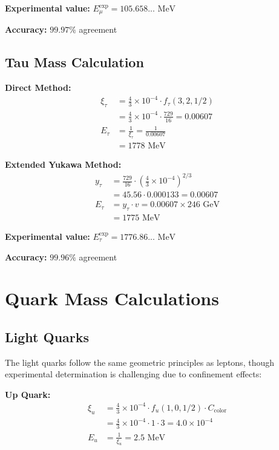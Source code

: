 \documentclass[12pt,a4paper]{article}
\begin{document}
	\textbf{Experimental value:} $E_\mu^{\text{exp}} = 105.658... \text{ MeV}$
	
	\textbf{Accuracy:} $99.97\%$ agreement
	
	\subsection{Tau Mass Calculation}
	\label{subsec:tau_calculation}
	
	\textbf{Direct Method:}
	\begin{align}
		\xi_\tau &= \frac{4}{3} \times 10^{-4} \cdot f_\tau(3,2,1/2) \\
		&= \frac{4}{3} \times 10^{-4} \cdot \frac{729}{16} = 0.00607 \\
		E_{\tau} &= \frac{1}{\xi_\tau} = \frac{1}{0.00607} \\
		&= 1778 \text{ MeV}
	\end{align}
	
	\textbf{Extended Yukawa Method:}
	\begin{align}
		y_\tau &= \frac{729}{16} \cdot \left(\frac{4}{3} \times 10^{-4}\right)^{2/3} \\
		&= 45.56 \cdot 0.000133 = 0.00607 \\
		E_\tau &= y_\tau \cdot v = 0.00607 \times 246 \text{ GeV} \\
		&= 1775 \text{ MeV}
	\end{align}
	
	\textbf{Experimental value:} $E_\tau^{\text{exp}} = 1776.86... \text{ MeV}$
	
	\textbf{Accuracy:} $99.96\%$ agreement
	
	\section{Quark Mass Calculations}
	\label{sec:quark_calculations}
	
	\subsection{Light Quarks}
	\label{subsec:light_quarks}
	
	The light quarks follow the same geometric principles as leptons, though experimental determination is challenging due to confinement effects:
	
	\textbf{Up Quark:}
	\begin{align}
		\xi_u &= \frac{4}{3} \times 10^{-4} \cdot f_u(1,0,1/2) \cdot C_{\text{color}} \\
		&= \frac{4}{3} \times 10^{-4} \cdot 1 \cdot 3 = 4.0 \times 10^{-4} \\
		E_u &= \frac{1}{\xi_u} = 2.5 \text{ MeV}
	\end{align}
	
\end{document}
